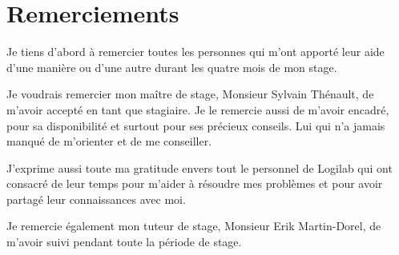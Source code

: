 \chapter*{Remerciements} 
Je tiens d’abord à remercier toutes les personnes qui m’ont apporté leur 
aide d’une manière ou d’une autre durant les quatre mois de mon stage.

Je voudrais remercier mon maître de stage, Monsieur Sylvain Thénault, de
m’avoir accepté en tant que stagiaire. Je le remercie aussi de m’avoir encadré,
pour sa disponibilité et surtout pour ses précieux conseils. Lui qui n’a jamais
manqué de m’orienter et de me conseiller.

J’exprime aussi toute ma gratitude envers tout le personnel de Logilab qui ont
consacré de leur temps pour m'aider à résoudre mes problèmes et pour avoir
partagé leur connaissances avec moi.

Je remercie également mon tuteur de stage, Monsieur Erik Martin-Dorel, de
m’avoir suivi pendant toute la période de stage.
